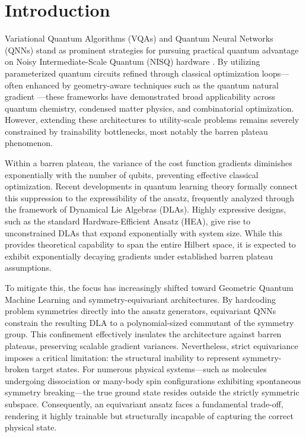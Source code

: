 \documentclass[pdflatex,sn-mathphys-num]{sn-jnl}
\theoremstyle{thmstyleone}
\theoremstyle{thmstyletwo}
\theoremstyle{thmstylethree}
\begin{document}

\maketitle

\section{Introduction}

Variational Quantum Algorithms (VQAs) and Quantum Neural Networks (QNNs) stand as prominent strategies for pursuing practical quantum advantage on Noisy Intermediate-Scale Quantum (NISQ) hardware \cite{preskill2018quantum,cerezo2021variational,peruzzo2014variational,farhi2014quantum,biamonte2017quantum}. By utilizing parameterized quantum circuits refined through classical optimization loops---often enhanced by geometry-aware techniques such as the quantum natural gradient \cite{stokes2020quantum}---these frameworks have demonstrated broad applicability across quantum chemistry, condensed matter physics, and combinatorial optimization. However, extending these architectures to utility-scale problems remains severely constrained by trainability bottlenecks, most notably the barren plateau phenomenon.

Within a barren plateau, the variance of the cost function gradients diminishes exponentially with the number of qubits, preventing effective classical optimization. Recent developments in quantum learning theory formally connect this suppression to the expressibility of the ansatz, frequently analyzed through the framework of Dynamical Lie Algebras (DLAs). Highly expressive designs, such as the standard Hardware-Efficient Ansatz (HEA), give rise to unconstrained DLAs that expand exponentially with system size. While this provides theoretical capability to span the entire Hilbert space, it is expected to exhibit exponentially decaying gradients under established barren plateau assumptions.

To mitigate this, the focus has increasingly shifted toward Geometric Quantum Machine Learning and symmetry-equivariant architectures. By hardcoding problem symmetries directly into the ansatz generators, equivariant QNNs constrain the resulting DLA to a polynomial-sized commutant of the symmetry group. This confinement effectively insulates the architecture against barren plateaus, preserving scalable gradient variances. Nevertheless, strict equivariance imposes a critical limitation: the structural inability to represent symmetry-broken target states. For numerous physical systems---such as molecules undergoing dissociation or many-body spin configurations exhibiting spontaneous symmetry breaking---the true ground state resides outside the strictly symmetric subspace. Consequently, an equivariant ansatz faces a fundamental trade-off, rendering it highly trainable but structurally incapable of capturing the correct physical state.
\end{document}
